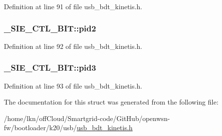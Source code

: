 Definition at line 91 of file usb\+\_\+bdt\+\_\+kinetis.\+h.

\subsubsection[{\texorpdfstring{pid2}{pid2}}]{ \+\_\+\+S\+I\+E\+\_\+\+C\+T\+L\+\_\+\+B\+I\+T\+::pid2}\hypertarget{struct___s_i_e___c_t_l___b_i_t_a32f6384fbb76a43f9b2f180727e06609}{}\label{struct___s_i_e___c_t_l___b_i_t_a32f6384fbb76a43f9b2f180727e06609}


Definition at line 92 of file usb\+\_\+bdt\+\_\+kinetis.\+h.

\subsubsection[{\texorpdfstring{pid3}{pid3}}]{ \+\_\+\+S\+I\+E\+\_\+\+C\+T\+L\+\_\+\+B\+I\+T\+::pid3}\hypertarget{struct___s_i_e___c_t_l___b_i_t_a1936a9b54096104134e40bd17104bf1f}{}\label{struct___s_i_e___c_t_l___b_i_t_a1936a9b54096104134e40bd17104bf1f}


Definition at line 93 of file usb\+\_\+bdt\+\_\+kinetis.\+h.



The documentation for this struct was generated from the following file\+:\begin{DoxyCompactItemize}
\item 
/home/lkn/off\+Cloud/\+Smartgrid-\/code/\+Git\+Hub/openwsn-\/fw/bootloader/k20/usb/\hyperlink{usb__bdt__kinetis_8h}{usb\+\_\+bdt\+\_\+kinetis.\+h}\end{DoxyCompactItemize}
